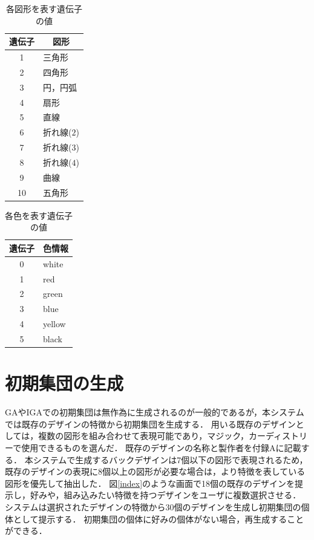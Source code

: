 \begin{table}[htbp]
	\centering
	\caption{各図形を表す遺伝子の値}
	\begin{tabular}{|c|l|} \hline
    \multicolumn{1}{|c|}{遺伝子} & \multicolumn{1}{|c|}{図形} \\ \hline
	1     & 三角形\\ \hline
	2   & 四角形 \\ \hline
	3     & 円，円弧 \\ \hline 
    4      & 扇形 \\ \hline 
    5      & 直線 \\ \hline 
    6      & 折れ線($2$) \\ \hline 
    7      & 折れ線($3$) \\ \hline
    8      & 折れ線($4$)\\ \hline
    9      & 曲線\\ \hline
    10      & 五角形\\ \hline  
	\end{tabular}
	\label{sharp}
\end{table}

\begin{table}[htbp]
	\centering
    \caption{各色を表す遺伝子の値}
    \begin{tabular}{|c|l|} \hline
        \multicolumn{1}{|c|}{遺伝子} & \multicolumn{1}{|c|}{色情報} \\ \hline
    0   & white \\ \hline
	1     & red\\ \hline
	2   & green \\ \hline
	3     & blue \\ \hline 
    4      & yellow \\ \hline 
    5      & black \\ \hline  
	\end{tabular}
	\label{color}
\end{table}

\section{初期集団の生成}
GAやIGAでの初期集団は無作為に生成されるのが一般的であるが，本システムでは既存のデザインの特徴から初期集団を生成する．
用いる既存のデザインとしては，複数の図形を組み合わせて表現可能であり，マジック，カーディストリーで使用できるものを選んだ．
既存のデザインの名称と製作者を付録Aに記載する．
本システムで生成するバックデザインは7個以下の図形で表現されるため，既存のデザインの表現に8個以上の図形が必要な場合は，より特徴を表している図形を優先して抽出した．
図\ref{index}のような画面で18個の既存のデザインを提示し，好みや，組み込みたい特徴を持つデザインをユーザに複数選択させる．
システムは選択されたデザインの特徴から30個のデザインを生成し初期集団の個体として提示する．
初期集団の個体に好みの個体がない場合，再生成することができる．

